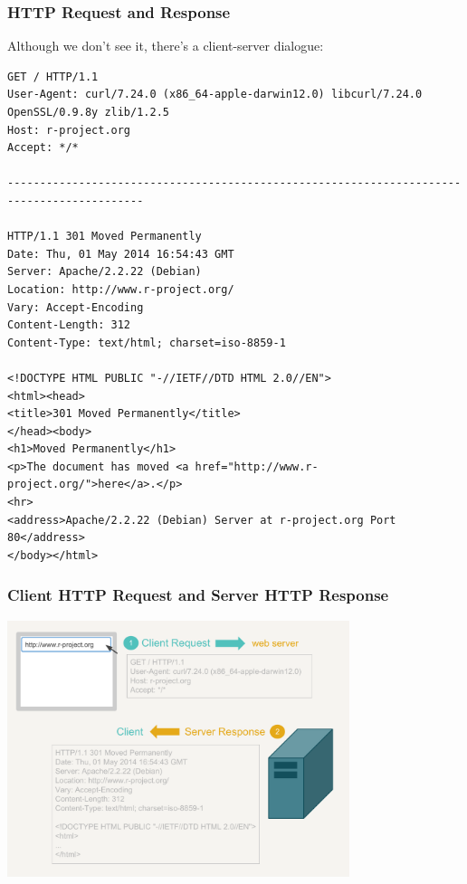\documentclass{beamer}\usepackage[]{graphicx}\usepackage[]{color}
\begin{document}
\begin{frame}[fragile]
\frametitle{HTTP Request and Response}

Although we don't see it, there's a client-server dialogue:

{\tiny
\begin{verbatim}
GET / HTTP/1.1
User-Agent: curl/7.24.0 (x86_64-apple-darwin12.0) libcurl/7.24.0 OpenSSL/0.9.8y zlib/1.2.5
Host: r-project.org
Accept: */*

-------------------------------------------------------------------------------------------

HTTP/1.1 301 Moved Permanently
Date: Thu, 01 May 2014 16:54:43 GMT
Server: Apache/2.2.22 (Debian)
Location: http://www.r-project.org/
Vary: Accept-Encoding
Content-Length: 312
Content-Type: text/html; charset=iso-8859-1
 
<!DOCTYPE HTML PUBLIC "-//IETF//DTD HTML 2.0//EN">
<html><head>
<title>301 Moved Permanently</title>
</head><body>
<h1>Moved Permanently</h1>
<p>The document has moved <a href="http://www.r-project.org/">here</a>.</p>
<hr>
<address>Apache/2.2.22 (Debian) Server at r-project.org Port 80</address>
</body></html>
\end{verbatim}
}

\end{frame}


\begin{frame}
\frametitle{Client HTTP Request and Server HTTP Response}

\begin{center}
\includegraphics[width=10cm]{images/http_request_response.pdf}
\end{center}

\end{frame}
\end{document}
